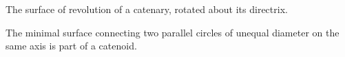  The surface of revolution of a catenary, rotated about its directrix.
\par
The minimal surface connecting two parallel circles of unequal 
diameter on the same axis is part of a catenoid.
